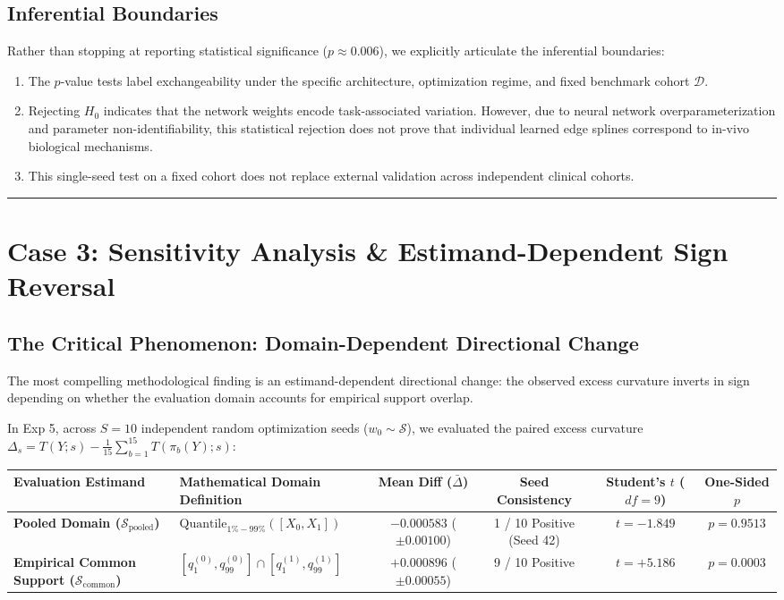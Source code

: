 \documentclass[11pt,a4paper]{article}
\begin{document}
\subsection{Inferential Boundaries}
Rather than stopping at reporting statistical significance ($p \approx 0.006$), we explicitly articulate the inferential boundaries:
\begin{enumerate}
    \item The $p$-value tests label exchangeability under the specific architecture, optimization regime, and fixed benchmark cohort $\mathcal{D}$.
    \item Rejecting $H_0$ indicates that the network weights encode task-associated variation. However, due to neural network overparameterization and parameter non-identifiability, this statistical rejection does not prove that individual learned edge splines correspond to in-vivo biological mechanisms.
    \item This single-seed test on a fixed cohort does not replace external validation across independent clinical cohorts.
\end{enumerate}

\vspace{0.5em}
\hrule
\vspace{1em}

\section{Case 3: Sensitivity Analysis \& Estimand-Dependent Sign Reversal}

\subsection{The Critical Phenomenon: Domain-Dependent Directional Change}
The most compelling methodological finding is an estimand-dependent directional change: the observed excess curvature inverts in sign depending on whether the evaluation domain accounts for empirical support overlap.

In Exp 5, across $S = 10$ independent random optimization seeds ($w_0 \sim \mathcal{S}$), we evaluated the paired excess curvature $\Delta_s = T(Y; s) - \frac{1}{15} \sum_{b=1}^{15} T(\pi_b(Y); s)$:

\begin{table}[h]
\centering
\small
\begin{tabular}{llcccc}
\toprule
\textbf{Evaluation Estimand} & \textbf{Mathematical Domain Definition} & \textbf{Mean Diff ($\bar{\Delta}$)} & \textbf{Seed Consistency} & \textbf{Student's $t$ ($df=9$)} & \textbf{One-Sided $p$} \\
\midrule
\textbf{Pooled Domain ($\mathcal{S}_{\mathrm{pooled}}$)} & $\text{Quantile}_{1\%-99\%}([X_0, X_1])$ & $\mathbf{-0.000583}$ ($\pm 0.00100$) & 1 / 10 Positive (Seed 42) & $t = -1.849$ & $p = 0.9513$ \\
\textbf{Empirical Common Support ($\mathcal{S}_{\mathrm{common}}$)} & $[q_1^{(0)}, q_{99}^{(0)}] \cap [q_1^{(1)}, q_{99}^{(1)}]$ & $\mathbf{+0.000896}$ ($\pm 0.00055$) & 9 / 10 Positive & $t = +5.186$ & $p = 0.0003$ \\
\bottomrule
\end{tabular}
\end{table}
\end{document}
